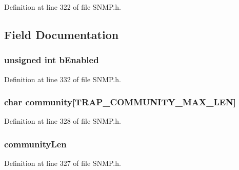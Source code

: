 Definition at line 322 of file S\+N\+M\+P.\+h.



\subsection{Field Documentation}
\hypertarget{struct_t_r_a_p___i_n_f_o_a4f68a3a20cae308b9abeee38bdb0e7b6}{}
\subsubsection[{b\+Enabled}]{\setlength{\rightskip}{0pt plus 5cm}unsigned int b\+Enabled}\label{struct_t_r_a_p___i_n_f_o_a4f68a3a20cae308b9abeee38bdb0e7b6}


Definition at line 332 of file S\+N\+M\+P.\+h.

\hypertarget{struct_t_r_a_p___i_n_f_o_add1f21718ceba7cec551214a60f232a6}{}
\subsubsection[{community}]{\setlength{\rightskip}{0pt plus 5cm}char community\mbox{[}{\bf T\+R\+A\+P\+\_\+\+C\+O\+M\+M\+U\+N\+I\+T\+Y\+\_\+\+M\+A\+X\+\_\+\+L\+E\+N}\mbox{]}}\label{struct_t_r_a_p___i_n_f_o_add1f21718ceba7cec551214a60f232a6}


Definition at line 328 of file S\+N\+M\+P.\+h.

\hypertarget{struct_t_r_a_p___i_n_f_o_a1c7f631640a7359d70137a0c41b0099c}{}
\subsubsection[{community\+Len}]{ community\+Len}\label{struct_t_r_a_p___i_n_f_o_a1c7f631640a7359d70137a0c41b0099c}


Definition at line 327 of file S\+N\+M\+P.\+h.

\hypertarget{struct_t_r_a_p___i_n_f_o_a52d4473af1591b9de69859139d8c564b}{}
